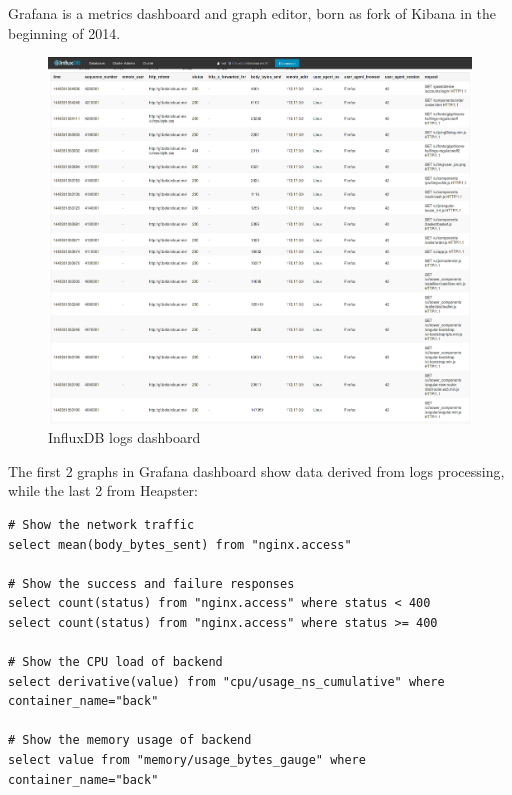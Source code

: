 Grafana is a metrics dashboard and graph editor, born as fork of Kibana in the beginning of 2014.

\begin{figure}[htbp]
\centering
\includegraphics{media/ch6-influxdb.png}
\caption{InfluxDB logs dashboard}
\end{figure}

The first 2 graphs in Grafana dashboard show data derived from logs processing, while the last 2 from Heapster:

\begin{verbatim}
# Show the network traffic
select mean(body_bytes_sent) from "nginx.access"

# Show the success and failure responses
select count(status) from "nginx.access" where status < 400
select count(status) from "nginx.access" where status >= 400

# Show the CPU load of backend
select derivative(value) from "cpu/usage_ns_cumulative" where container_name="back"

# Show the memory usage of backend
select value from "memory/usage_bytes_gauge" where container_name="back"
\end{verbatim}

